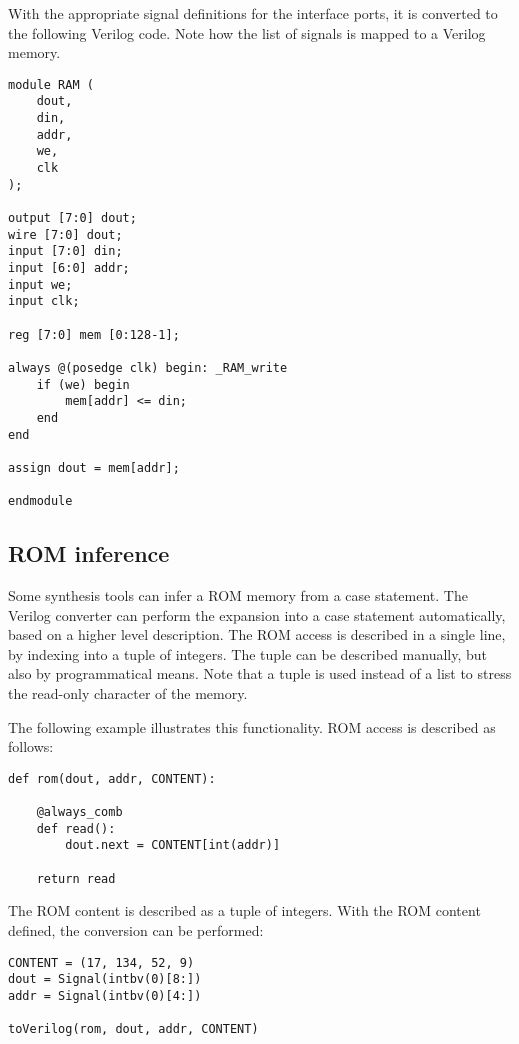 With the appropriate signal definitions for the interface ports, it is
converted to the following Verilog code. Note how the
list of signals  is mapped to a Verilog memory.

\begin{verbatim}
module RAM (
    dout,
    din,
    addr,
    we,
    clk
);

output [7:0] dout;
wire [7:0] dout;
input [7:0] din;
input [6:0] addr;
input we;
input clk;

reg [7:0] mem [0:128-1];

always @(posedge clk) begin: _RAM_write
    if (we) begin
        mem[addr] <= din;
    end
end

assign dout = mem[addr];

endmodule
\end{verbatim}


\subsection{ROM inference \label{conf-usage-ROM}}
Some synthesis tools can infer a ROM memory from a case statement. The
Verilog converter can perform the expansion into a case statement
automatically, based on a higher level description. The ROM access is
described in a single line, by indexing into a tuple of integers. The
tuple can be described manually, but also by programmatical
means. Note that a tuple is used instead of a list to stress the
read-only character of the memory.

The following example illustrates this functionality. ROM access
is described as follows:

\begin{verbatim}
def rom(dout, addr, CONTENT):
                                                                                
    @always_comb
    def read():
        dout.next = CONTENT[int(addr)]
                                                                                
    return read
\end{verbatim}

The ROM content is described as a tuple of integers. With the
ROM content defined, the conversion can be performed:

\begin{verbatim}
CONTENT = (17, 134, 52, 9)
dout = Signal(intbv(0)[8:])
addr = Signal(intbv(0)[4:])
                                                                                
toVerilog(rom, dout, addr, CONTENT)
\end{verbatim}

